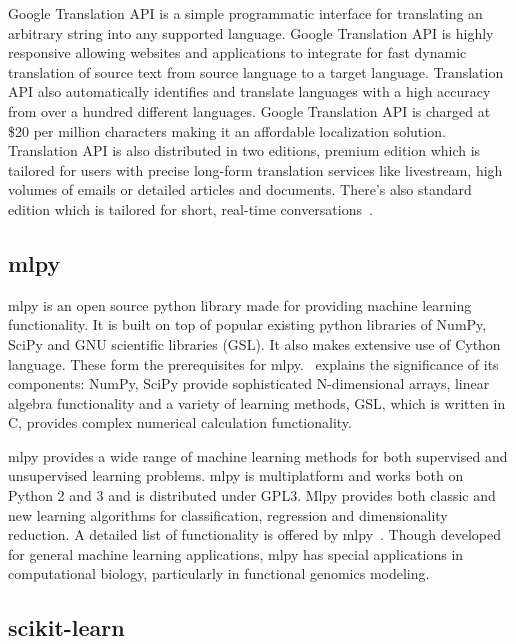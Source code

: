     Google Translation API is a simple programmatic interface for
    translating an arbitrary string into any supported
    language. Google Translation API is highly responsive allowing
    websites and applications to integrate for fast dynamic
    translation of source text from source language to a target
    language. Translation API also automatically identifies and
    translate languages with a high accuracy from over a hundred
    different languages.  Google Translation API is charged at \$20
    per million characters making it an affordable localization
    solution. Translation API is also distributed in two editions,
    premium edition which is tailored for users with precise long-form
    translation services like livestream, high volumes of emails or
    detailed articles and documents. There’s also standard edition
    which is tailored for short, real-time
    conversations~\cite{www-translation}.

\subsection{mlpy }
    
mlpy is an open source python library made for providing machine
learning functionality. It is built on top of popular existing python
libraries of NumPy, SciPy and GNU scientific libraries (GSL). It also
makes extensive use of Cython language. These form the prerequisites
for mlpy.~\cite{DBLP:journals/corr/abs-1202-6548} explains the
significance of its components: NumPy, SciPy provide sophisticated
N-dimensional arrays, linear algebra functionality and a variety of
learning methods, GSL, which is written in C, provides complex
numerical calculation functionality.

mlpy provides a wide range of machine learning methods for both
supervised and unsupervised learning problems. mlpy is multiplatform
and works both on Python 2 and 3 and is distributed under GPL3. Mlpy
provides both classic and new learning algorithms for classification,
regression and dimensionality reduction. A detailed list of
functionality is offered by mlpy~\cite{www-mlpy}. Though developed for
general machine learning applications, mlpy has special applications
in computational biology, particularly in functional genomics
modeling.

    \pv

\subsection{scikit-learn}

